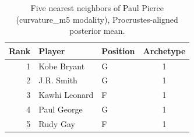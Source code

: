 \begin{table}[htbp]
  \centering\small
  \begin{tabular}{rllc}
    \toprule
    Rank & Player & Position & Archetype \\
    \midrule
    1 & Kobe Bryant & G & 1 \\
    2 & J.R. Smith & G & 1 \\
    3 & Kawhi Leonard & F & 1 \\
    4 & Paul George & G & 1 \\
    5 & Rudy Gay & F & 1 \\
    \bottomrule
  \end{tabular}
  \caption{Five nearest neighbors of Paul Pierce (curvature_m5 modality), Procrustes-aligned posterior mean.}
  \label{tab:Paul_Pierce_neighbors_curvature_m5}
\end{table}


